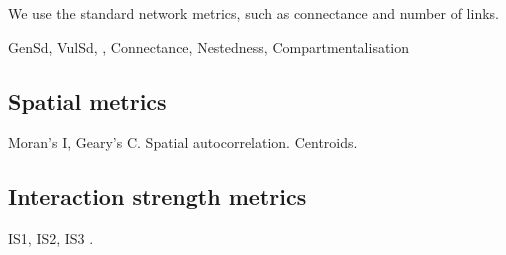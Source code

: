 We use the standard network metrics, such as connectance and number of links. 

GenSd, VulSd, , Connectance, Nestedness, Compartmentalisation

\subsection{Spatial metrics}
\label{sec:def_spatial_metrics}

Moran's I, Geary's C. Spatial autocorrelation. Centroids.

\subsection{Interaction strength metrics}

IS1, IS2, IS3 \cite{berlow2004interaction}.
